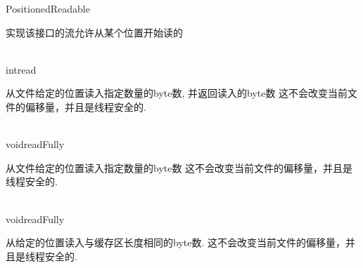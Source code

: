 \begin{XeClass}{PositionedReadable}
   
 实现该接口的流允许从某个位置开始读的

  \begin{XeMethod}{\XePublic\\ }{int}{read}
       
 从文件给定的位置读入指定数量的byte数, 并返回读入的byte数
 这不会改变当前文件的偏移量，并且是线程安全的.

  \end{XeMethod}

  \begin{XeMethod}{\XePublic\\ }{void}{readFully}
       
 从文件给定的位置读入指定数量的byte数
 这不会改变当前文件的偏移量，并且是线程安全的.

  \end{XeMethod}

  \begin{XeMethod}{\XePublic\\ }{void}{readFully}
       
 从给定的位置读入与缓存区长度相同的byte数.
 这不会改变当前文件的偏移量，并且是线程安全的.

  \end{XeMethod}

\end{XeClass}
